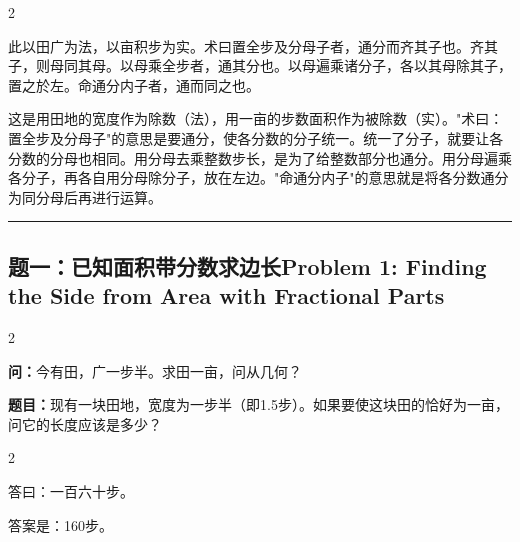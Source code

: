 \documentclass[11pt,a4paper]{article}
\newcommand{\longline}{\noindent\rule{\textwidth}{0.4pt}}
\newcommand{\bilingualsubsection}[2]{%
  \subsection{#1\hfill\normalfont\normalsize\color{sectioncolor}#2}%
}
\begin{document}
\vspace{0.3cm}

\begin{paracol}{2}

\begin{commentarybox}
此以田广为法，以亩积步为实。术曰置全步及分母子者，通分而齐其子也。齐其子，则母同其母。以母乘全步者，通其分也。以母遍乘诸分子，各以其母除其子，置之於左。命通分内子者，通而同之也。
\end{commentarybox}

\switchcolumn

\begin{commentarybox}
这是用田地的宽度作为除数（法），用一亩的步数面积作为被除数（实）。"术曰：置全步及分母子"的意思是要通分，使各分数的分子统一。统一了分子，就要让各分数的分母也相同。用分母去乘整数步长，是为了给整数部分也通分。用分母遍乘各分子，再各自用分母除分子，放在左边。"命通分内子"的意思就是将各分数通分为同分母后再进行运算。
\end{commentarybox}

\end{paracol}

\vspace{0.5cm}
\longline
\vspace{0.3cm}

\bilingualsubsection{题一：已知面积带分数求边长}{Problem 1: Finding the Side from Area with Fractional Parts}

\begin{paracol}{2}

\begin{problembox}
\textbf{问：}今有田，广一步半。求田一亩，问从几何？
\end{problembox}

\switchcolumn

\begin{problembox}
\textbf{题目：}现有一块田地，宽度为一步半（即1.5步）。如果要使这块田的恰好为一亩，问它的长度应该是多少？
\end{problembox}

\end{paracol}

\vspace{0.2cm}

\begin{paracol}{2}

\begin{answerbox}[\CJKfamily{rm}答 · 原文]
答曰：一百六十步。
\end{answerbox}

\switchcolumn

\begin{answerbox}[白话文：答案]
答案是：160步。
\end{answerbox}

\end{paracol}
\end{document}
